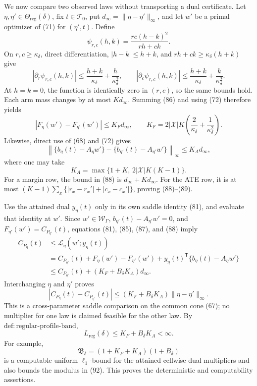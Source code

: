 We now compare two observed laws without transporting a dual certificate.  Let \(\eta,\eta'\in\Theta_{\mathrm{reg}}(\delta)\), fix \(t\in\mathcal T_0\), put \(d_\infty=\|\eta-\eta'\|_\infty\), and let \(w'\) be a primal optimizer of (71) for \((\eta',t)\).  Define
\[
\psi_{r,c}(h,k)=\frac{rc(h-k)^2}{rh+ck}.
\]
On \(r,c\geq\kappa_\delta\), direct differentiation, \(|h-k|\leq h+k\), and \(rh+ck\geq\kappa_\delta(h+k)\) give
\[
|\partial_r\psi_{r,c}(h,k)|
\leq\frac{h+k}{\kappa_\delta}+\frac{h}{\kappa_\delta^2},
\qquad
|\partial_c\psi_{r,c}(h,k)|
\leq\frac{h+k}{\kappa_\delta}+\frac{k}{\kappa_\delta^2}.
\tag{86}
\]
At \(h=k=0\), the function is identically zero in \((r,c)\), so the same bounds hold.  Each arm mass changes by at most \(Kd_\infty\).  Summing (86) and using (72) therefore yields
\[
|F_\eta(w')-F_{\eta'}(w')|
\leq K_Fd_\infty,
\qquad
K_F=2|\mathcal X|K
\left(\frac{2}{\kappa_\delta}+\frac{1}{\kappa_\delta^2}\right).
\tag{87}
\]
Likewise, direct use of (68) and (72) gives
\[
\left\|
\{b_\eta(t)-A_\eta w'\}
-\{b_{\eta'}(t)-A_{\eta'}w'\}
\right\|_\infty
\leq K_A d_\infty,
\tag{88}
\]
where one may take
\[
K_A=\max\{1+K,\,2|\mathcal X|K(K-1)\}.
\tag{89}
\]
For a margin row, the bound in (88) is \(d_\infty+Kd_\infty\).  For the ATE row, it is at most \((K-1)\sum_x\{|r_x-r_x'|+|c_x-c_x'|\}\), proving (88)--(89).

Use the attained dual \(y_\eta(t)\) only in its own saddle identity (81), and evaluate that identity at \(w'\).  Since \(w'\in\mathcal W_\Gamma\), \(b_{\eta'}(t)-A_{\eta'}w'=0\), and \(F_{\eta'}(w')=C_{P_{\eta'}}(t)\), equations (81), (85), (87), and (88) imply
\[
\begin{aligned}
C_{P_\eta}(t)
&\leq\mathcal L_\eta(w';y_\eta(t))\\
&=C_{P_{\eta'}}(t)
+F_\eta(w')-F_{\eta'}(w')
+y_\eta(t)^{\mathsf T}\{b_\eta(t)-A_\eta w'\}\\
&\leq C_{P_{\eta'}}(t)
+(K_F+B_\delta K_A)d_\infty.
\end{aligned}
\tag{90}
\]
Interchanging \(\eta\) and \(\eta'\) proves
\[
|C_{P_\eta}(t)-C_{P_{\eta'}}(t)|
\leq(K_F+B_\delta K_A)\|\eta-\eta'\|_\infty.
\tag{91}
\]
This is a cross-parameter saddle comparison on the common cone (67); no multiplier for one law is claimed feasible for the other law.  By \(\mathrm{def{:}regular\mbox{-}profile\mbox{-}band}\),
\[
L_{\mathrm{reg}}(\delta)
\leq K_F+B_\delta K_A<\infty.
\tag{92}
\]
For example,
\[
\mathfrak B_\delta=(1+K_F+K_A)(1+B_\delta)
\tag{93}
\]
is a computable uniform \(\ell_1\)-bound for the attained cellwise dual multipliers and also bounds the modulus in (92).  This proves the deterministic and computability assertions.

